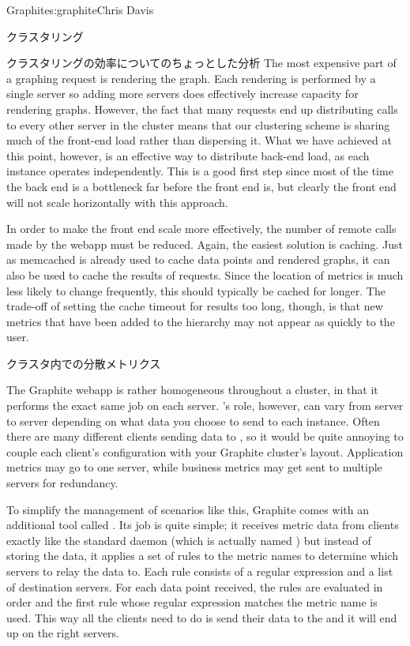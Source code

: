 \begin{aosachapter}{Graphite}{s:graphite}{Chris Davis}
\begin{aosasect1}{クラスタリング}
\begin{aosasect2}{クラスタリングの効率についてのちょっとした分析}
The most expensive part of a graphing request is rendering the graph.
Each rendering is performed by a single server so adding more servers
does effectively increase capacity for rendering graphs. However, the
fact that many requests end up distributing  calls to every
other server in the cluster means that our clustering scheme is
sharing much of the front-end load rather than dispersing it.  What we
have achieved at this point, however, is an effective way to
distribute back-end load, as each  instance operates
independently.  This is a good first step since most of the time the
back end is a bottleneck far before the front end is, but clearly the
front end will not scale horizontally with this approach.

In order to make the front end scale more effectively, the number of
remote  calls made by the webapp must be reduced. Again,
the easiest solution is caching. Just as memcached is already used to
cache data points and rendered graphs, it can also be used to cache
the results of  requests.  Since the location of metrics is
much less likely to change frequently, this should typically be cached
for longer. The trade-off of setting the cache timeout for 
results too long, though, is that new metrics that have been added to
the hierarchy may not appear as quickly to the user.

\end{aosasect2}

\begin{aosasect2}{クラスタ内での分散メトリクス}

The Graphite webapp is rather homogeneous throughout a cluster, in
that it performs the exact same job on each server. 's role,
however, can vary from server to server depending on what data you
choose to send to each instance. Often there are many different
clients sending data to , so it would be quite annoying to
couple each client's configuration with your Graphite cluster's
layout. Application metrics may go to one  server, while
business metrics may get sent to multiple  servers for
redundancy.

To simplify the management of scenarios like this, Graphite comes with
an additional tool called . Its job is quite simple;
it receives metric data from clients exactly like the standard 
daemon (which is actually named ) but instead of storing
the data, it applies a set of rules to the metric names to determine
which  servers to relay the data to. Each rule consists of
a regular expression and a list of destination servers. For each data
point received, the rules are evaluated in order and the first rule
whose regular expression matches the metric name is used. This way all
the clients need to do is send their data to the  and it
will end up on the right servers.


\end{aosasect2}
\end{aosasect1}
\end{aosachapter}
